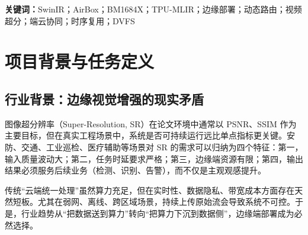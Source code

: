 \documentclass[12pt,a4paper]{ctexart}
\begin{document}
\tableofcontents
\newpage

\begin{abstract}
本项目面向边缘端视觉增强真实落地需求，围绕 AirBox（BM1684X）硬件平台构建了一套可部署、可复现、可扩展、可评估的 SwinIR 超分辨率系统。项目核心不是“只把模型跑通”，而是把图像恢复问题提升到“系统工程问题”：在显存受限、算力受限、网络受限、功耗受限和任务协同受限同时存在的条件下，如何得到长期稳定可用的端侧方案。

本系统以 SwinIR 作为重建主干，采用“节点化攻坚”方法完成逐步演进。Node0 建立稳定精度基线，Node1 验证画质上限，Node2 完成硬件预处理接管，Node3 解决大图分块与边界融合伪影，Node4--Node5 构建语义优先与纹理兜底双路由，Node6 完成视频并发流水化，Node7 验证检测闭环增益，Node8 建立动态 TTA 甜点位策略，Node10 验证端云协同弱网链路，Node11 实现跨帧稀疏复用，Node12 探索 C++ 后处理算子接口降 I/O 墙，Node13 完成复杂度驱动 DVFS 动态节能，Node14 提供盲超分退化感知防御，Node15 给出蒸馏与双模型路由扩展路线。

量化结果表明：系统可稳定达到 33dB 级别重建质量，端云协同在高保真与甜点位两档分别实现 84.98\% 与 97.30\% 带宽节省，DVFS 策略在真实视频中实现 42.71\% 动态节电；同时，超分处理对下游检测置信度有可观提升，验证了“视觉增强服务业务任务”这一核心价值。本文按“问题定义、技术原理、系统架构、详细实现、逐图分析、风险闭环、复现流程、扩展规划”完整展开，形成可直接用于正式提交与工程归档的完整文档。
\end{abstract}

\textbf{关键词：}SwinIR；AirBox；BM1684X；TPU-MLIR；边缘部署；动态路由；视频超分；端云协同；时序复用；DVFS

\newpage

\section{项目背景与任务定义}

\subsection{行业背景：边缘视觉增强的现实矛盾}

图像超分辨率（Super-Resolution, SR）在论文环境中通常以 PSNR、SSIM 作为主要目标，但在真实工程场景中，系统是否可持续运行远比单点指标更关键。安防、交通、工业巡检、医疗辅助等场景对 SR 的需求可以归纳为四个特征：第一，输入质量波动大；第二，任务时延要求严格；第三，边缘端资源有限；第四，输出结果必须服务后续业务（检测、识别、告警），而不仅是主观观感提升。

传统“云端统一处理”虽然算力充足，但在实时性、数据隐私、带宽成本方面存在天然短板。尤其在弱网、离线、跨区域场景，持续上传原始流会导致系统不可控。于是，行业趋势从“把数据送到算力”转向“把算力下沉到数据侧”，边缘端部署成为必然选择。
\end{document}
